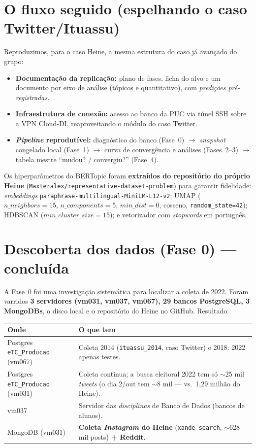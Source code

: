 \documentclass[11pt,a4paper]{article}
\begin{document}
\section{O fluxo seguido (espelhando o caso Twitter/Ituassu)}

Reproduzimos, para o caso Heine, a mesma estrutura do caso já avançado do grupo:

\begin{itemize}
\item \textbf{Documentação da replicação:} plano de fases, ficha do alvo e um documento por
eixo de análise (tópicos e quantitativo), com \emph{predições pré-registradas}.
\item \textbf{Infraestrutura de conexão:} acesso ao banco da PUC via túnel SSH sobre a VPN
Cloud-DI, reaproveitando o módulo do caso Twitter.
\item \textbf{\emph{Pipeline} reprodutível:} diagnóstico do banco (Fase~0) $\rightarrow$
\emph{snapshot} congelado local (Fase~1) $\rightarrow$ curva de convergência e análises
(Fases~2--3) $\rightarrow$ tabela mestre ``mudou? / convergiu?'' (Fase~4).
\end{itemize}

Os hiperparâmetros do BERTopic foram \textbf{extraídos do repositório do próprio Heine}
(\texttt{Maxteralex/representative-dataset-problem}) para garantir fidelidade:
\emph{embeddings} \texttt{paraphrase-multilingual-MiniLM-L12-v2}; UMAP
($n\_neighbors{=}15$, $n\_components{=}5$, $min\_dist{=}0$, cosseno, \texttt{random\_state=42});
HDBSCAN ($min\_cluster\_size{=}15$); e vetorizador com \emph{stopwords} em português.

\section{Descoberta dos dados (Fase 0) — concluída}

A Fase~0 foi uma investigação sistemática para localizar a coleta de 2022. Foram varridos
\textbf{3 servidores (vm031, vm037, vm067), 29 bancos PostgreSQL, 3 MongoDBs}, o disco
local e o repositório do Heine no GitHub. Resultado:

\begin{center}\small
\begin{tabular}{@{}p{5.2cm}p{9.3cm}@{}}
\toprule
\textbf{Onde} & \textbf{O que tem} \\
\midrule
Postgres \texttt{eTC\_Producao} (vm067) & Coleta 2014 (\texttt{ituassu\_2014}, caso Twitter) e 2018; 2022 apenas testes. \\
Postgres \texttt{eTC\_Producao} (vm031) & Coleta contínua; a busca eleitoral 2022 tem só $\sim$25 mil \emph{tweets} (o dia 2/out tem $\sim$8 mil — vs.\ 1,29 milhão do Heine). \\
vm037 & Servidor das \emph{disciplinas} de Banco de Dados (bancos de alunos). \\
MongoDB (vm031) & \textbf{Coleta \emph{Instagram} do Heine} (\texttt{xande\_search}, $\sim$628 mil posts) \textbf{+ Reddit}. \\
\bottomrule
\end{tabular}
\end{center}
\end{document}

